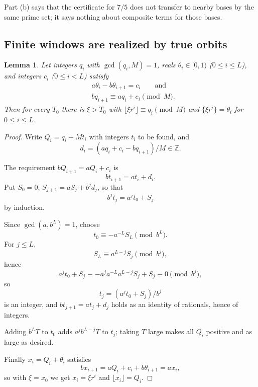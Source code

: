 \documentclass[11pt,reqno]{amsart}
\newtheorem{lemma}[theorem]{Lemma}
\theoremstyle{definition}
\theoremstyle{remark}
\begin{document}
Part (b) says that the certificate for \(7/5\) does not transfer to
nearby bases by the same prime set; it says nothing about composite
terms for those bases.

\subsection{Finite windows are realized by true orbits}\label{sec:8.2}

\begin{samepage}
\begin{lemma}\leavevmode\label{thm:41}
Let integers \(q_i\) with \(\gcd(q_i,M)=1\), reals
\(\theta_i\in[0,1)\) (\(0\le i\le L\)), and integers \(c_i\)
(\(0\le i<L\)) satisfy
\[
\begin{aligned}
&a\theta_i-b\theta_{i+1}=c_i\qquad\text{and}\\
&bq_{i+1}\equiv aq_i+c_i\pmod M.
\end{aligned}
\]
Then for every \(T_0\) there is
\(\xi>T_0\) with \(\lfloor\xi r^i\rfloor\equiv q_i\pmod M\) and
\(\{\xi r^i\}=\theta_i\) for \(0\le i\le L\).
\label{thm-end:41}
\end{lemma}
\end{samepage}

\begin{proof}\leavevmode\label{proof:41}
Write \(Q_i=q_i+Mt_i\) with integers \(t_i\) to be found, and
\[
d_i=(aq_i+c_i-bq_{i+1})/M\in\mathbb Z.
\]

The requirement
\(bQ_{i+1}=aQ_i+c_i\) is
\[
bt_{i+1}=at_i+d_i.
\]
Put \(S_0=0\),
\(S_{j+1}=aS_j+b^jd_j\), so that
\[
b^jt_j=a^jt_0+S_j
\]
by induction.

Since \(\gcd(a,b^L)=1\), choose
\[
t_0\equiv-a^{-L}S_L\pmod{b^L}.
\]
For
\(j\le L\),
\[
S_L\equiv a^{L-j}S_j\pmod{b^j},
\]
hence
\[
a^jt_0+S_j\equiv-a^ja^{-L}a^{L-j}S_j+S_j\equiv0\pmod{b^j},
\]
so
\[
t_j=(a^jt_0+S_j)/b^j
\]
is an integer, and \(bt_{j+1}=at_j+d_j\) holds
as an identity of rationals, hence of integers.

Adding \(b^LT\) to
\(t_0\) adds \(a^jb^{L-j}T\) to \(t_j\); taking \(T\) large makes all
\(Q_i\) positive and as large as desired.

Finally
\(x_i=Q_i+\theta_i\) satisfies
\[
bx_{i+1}=aQ_i+c_i+b\theta_{i+1}=ax_i,
\]
so with \(\xi=x_0\) we get \(x_i=\xi r^i\) and
\(\lfloor x_i\rfloor=Q_i\). \qedhere
\end{proof}
\end{document}
